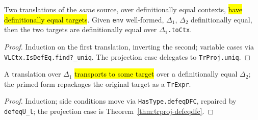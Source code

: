 \begin{theorem}
\label{thm:trexprs-uniq}
\leanok
{}

 Two translations of the \emph{same} source, over definitionally equal contexts, \hl{have definitionally equal targets}. Given \texttt{env} well-formed, $\Delta_1$, $\Delta_2$ definitionally equal, then the two targets are definitionally equal over $\Delta_1$\texttt{.toCtx}.
\end{theorem}
\begin{proof}
\leanok
{} Induction on the first translation, inverting the second; variable cases via \texttt{VLCtx.IsDefEq.find?\_uniq}. The projection case delegates to \texttt{TrProj.uniq}.
\end{proof}

\begin{theorem}
\label{thm:trexprs-defeqdfc}
\leanok
{}
 A translation over $\Delta_1$ \hl{transports to some target} over a definitionally equal $\Delta_2$; the primed form repackages the original target as a \texttt{TrExpr}.
\end{theorem}
\begin{proof}
\leanok
{} Induction; side conditions move via \texttt{HasType.defeqDFC}, repaired by \texttt{defeqU\_l}; the projection case is Theorem~\ref{thm:trproj-defeqdfc}.
\end{proof}

